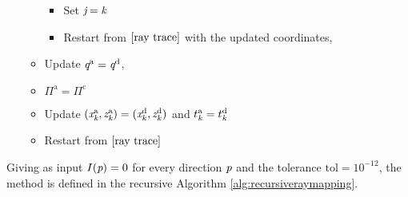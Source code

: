 \begin{enumerate}
\begin{itemize}
\begin{itemize}
\item Set $\textit{j} = \textit{k}$
\item Restart from $\ref{ray trace}$ with the updated coordinates,
\end{itemize}
\item Update $\textit{q}^{\textrm{a}}= \textit{q}^{\textrm{d}}$,
\item $\Pi^{\textrm{a}} = \Pi^{\textrm{c}}$
\item Update $(\textit{x}_{\textit{k}}^{\textrm{a}}, \textit{z}_{\textit{k}}^{\textrm{a}}) = (\textit{x}_{\textit{k}}^{\textrm{d}}, \textit{z}_{\textit{k}}^{\textrm{d}})$ and $t_{\textit{k}}^{\textrm{a}}= t_{\textit{k}}^{\textrm{d}}$
\item Restart from $\ref{ray trace}$
\end{itemize}
\end{enumerate}
Giving as input $I(\textit{p})=0$ for every direction $\textit{p}$ and the tolerance $\textrm{tol}=10^{-12}$,
the method is defined in the recursive Algorithm \ref{alg:recursiveraymapping}.
